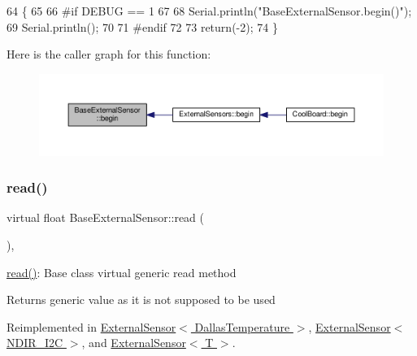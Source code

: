 \begin{DoxyCode}
64     \{
65     
66 \textcolor{preprocessor}{    #if DEBUG == 1 }
67     
68         Serial.println(\textcolor{stringliteral}{"BaseExternalSensor.begin()"});
69         Serial.println();
70     
71 \textcolor{preprocessor}{    #endif}
72 
73         \textcolor{keywordflow}{return}(-2);
74     \}
\end{DoxyCode}
Here is the caller graph for this function\+:\nopagebreak
\begin{figure}[H]
\begin{center}
\leavevmode
\includegraphics[width=350pt]{classBaseExternalSensor_a87d132803d4f4fdd4e66332809f0c9a0_icgraph}
\end{center}
\end{figure}
\mbox{\label{classBaseExternalSensor_a1564f16deacf57b51b9948ac29db4291}} 
\subsubsection{\texorpdfstring{read()}{read()}}
{\footnotesize\ttfamily virtual float Base\+External\+Sensor\+::read (\begin{DoxyParamCaption}{ }\end{DoxyParamCaption})\hspace{0.3cm}{\ttfamily [inline]}, {\ttfamily [virtual]}}

\hyperlink{classBaseExternalSensor_a1564f16deacf57b51b9948ac29db4291}{read()}\+: Base class virtual generic read method

\begin{DoxyReturn}{Returns}
generic value as it is not supposed to be used 
\end{DoxyReturn}


Reimplemented in \hyperlink{classExternalSensor_3_01DallasTemperature_01_4_a1e725d9338314515d4e5dc456ed6a6c8}{External\+Sensor$<$ Dallas\+Temperature $>$}, \hyperlink{classExternalSensor_3_01NDIR__I2C_01_4_a239d18652e9fb4673842ae9726edf44f}{External\+Sensor$<$ N\+D\+I\+R\+\_\+\+I2\+C $>$}, and \hyperlink{classExternalSensor_a5fb3afc7d244fb86dac68ab5481bc407}{External\+Sensor$<$ T $>$}.



